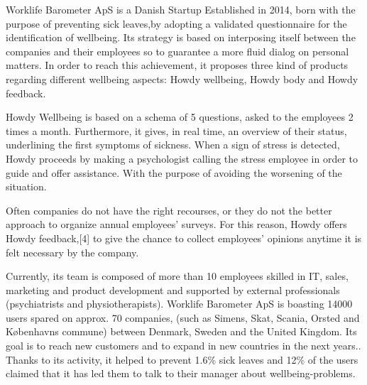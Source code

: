 


Worklife Barometer ApS is a Danish Startup Established in 2014, born with the purpose of preventing sick leaves,by adopting a validated questionnaire for the identification of wellbeing. Its strategy is based on interposing itself between the companies and their employees so to guarantee a more fluid dialog on personal matters.     
In order to reach this achievement, it proposes three kind of products regarding different wellbeing aspects: Howdy wellbeing, Howdy body and Howdy feedback.\cite{howdywebsite}

\noindent Howdy Wellbeing is based on a schema of 5 questions, asked to the employees 2 times a month.
Furthermore, it gives, in real time, an overview of their status, underlining the first symptoms of sickness.
When a sign of stress is detected, Howdy proceeds by making a psychologist calling the stress employee in order to guide and offer assistance. With the purpose of avoiding the worsening of the situation.

\noindent Often companies do not have the right recourses, or they do not the better approach to organize annual employees’ surveys. For this reason, Howdy offers Howdy feedback,[4] to give the chance to collect employees’ opinions anytime it is felt necessary by the company.

\noindent Currently, its team is composed of more than 10 employees skilled in IT, sales, marketing and product development and supported by external professionals (psychiatrists and physiotherapists). Worklife Barometer ApS is boasting 14000 users spared on approx. 70 companies, (such as Simens, Skat, Scania, Orsted and Københavns commune) between Denmark, Sweden and the United Kingdom. Its goal is to reach new customers and to expand in new countries in the next years.\cite{howdywebsite}. Thanks to its activity, it helped to prevent 1.6\% sick leaves and 12\% of the users claimed that it has led them to talk to their manager about wellbeing-problems. \cite{howdywebsite}  

